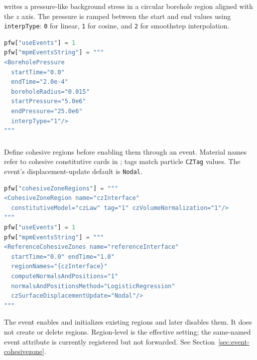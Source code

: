  writes a pressure-like background stress in a circular borehole region aligned with the \(z\) axis.  The pressure is ramped between the start and end values using \texttt{interpType}: \texttt{0} for linear, \texttt{1} for cosine, and \texttt{2} for smoothstep interpolation.

\begin{lstlisting}[language=Python,caption={Borehole-pressure event.}]
pfw["useEvents"] = 1
pfw["mpmEventsString"] = """
<BoreholePressure
  startTime="0.0"
  endTime="2.0e-4"
  boreholeRadius="0.015"
  startPressure="5.0e6"
  endPressure="25.0e6"
  interpType="1"/>
"""
\end{lstlisting}

\subsubsection{}
Define cohesive regions before enabling them through an event. Material names refer to cohesive constitutive cards in ; tags match particle \texttt{CZTag} values. The event's displacement-update default is \texttt{Nodal}.
\begin{lstlisting}[language=Python,caption={Register and enable a cohesive region.}]
pfw["cohesiveZoneRegions"] = """
<CohesiveZoneRegion name="czInterface"
  constitutiveModel="czLaw" tag="1" czVolumeNormalization="1"/>
"""
pfw["useEvents"] = 1
pfw["mpmEventsString"] = """
<ReferenceCohesiveZones name="referenceInterface"
  startTime="0.0" endTime="1.0"
  regionNames="{czInterface}"
  computeNormalsAndPositions="1"
  normalsAndPositionsMethod="LogisticRegression"
  czSurfaceDisplacementUpdate="Nodal"/>
"""
\end{lstlisting}
The event enables and initializes existing regions and later disables them. It does not create or delete regions. Region-level  is the effective setting; the same-named event attribute is currently registered but not forwarded. See Section~\ref{sec:event-cohesivezone}.

\subsubsection{}

